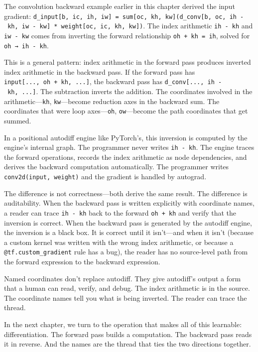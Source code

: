 \documentclass[11pt,titlepage]{article}
\begin{document}
The convolution backward example earlier in this chapter derived the
input gradient:
\texttt{d\_input{[}b,\ ic,\ ih,\ iw{]}\ =\ sum{[}oc,\ kh,\ kw{]}(d\_conv{[}b,\ oc,\ ih\ -\ kh,\ iw\ -\ kw{]}\ *\ weight{[}oc,\ ic,\ kh,\ kw{]})}.
The index arithmetic \texttt{ih\ -\ kh} and \texttt{iw\ -\ kw} comes
from inverting the forward relationship \texttt{oh\ +\ kh\ =\ ih},
solved for \texttt{oh\ →\ ih\ -\ kh}.

This is a general pattern: index arithmetic in the forward pass produces
inverted index arithmetic in the backward pass. If the forward pass has
\texttt{input{[}...,\ oh\ +\ kh,\ ...{]}}, the backward pass has
\texttt{d\_conv{[}...,\ ih\ -\ kh,\ ...{]}}. The subtraction inverts the
addition. The coordinates involved in the arithmetic---\texttt{kh},
\texttt{kw}---become reduction axes in the backward sum. The coordinates
that were loop axes---\texttt{oh}, \texttt{ow}---become the path
coordinates that get summed.

In a positional autodiff engine like PyTorch's, this inversion is
computed by the engine's internal graph. The programmer never writes
\texttt{ih\ -\ kh}. The engine traces the forward operations, records
the index arithmetic as node dependencies, and derives the backward
computation automatically. The programmer writes
\texttt{conv2d(input,\ weight)} and the gradient is handled by autograd.

The difference is not correctness---both derive the same result. The
difference is auditability. When the backward pass is written explicitly
with coordinate names, a reader can trace \texttt{ih\ -\ kh} back to the
forward \texttt{oh\ +\ kh} and verify that the inversion is correct.
When the backward pass is generated by the autodiff engine, the
inversion is a black box. It is correct until it isn't---and when it
isn't (because a custom kernel was written with the wrong index
arithmetic, or because a \texttt{@tf.custom\_gradient} rule has a bug),
the reader has no source-level path from the forward expression to the
backward expression.

Named coordinates don't replace autodiff. They give autodiff's output a
form that a human can read, verify, and debug. The index arithmetic is
in the source. The coordinate names tell you what is being inverted. The
reader can trace the thread.

In the next chapter, we turn to the operation that makes all of this
learnable: differentiation. The forward pass builds a computation. The
backward pass reads it in reverse. And the names are the thread that
ties the two directions together.
\end{document}
